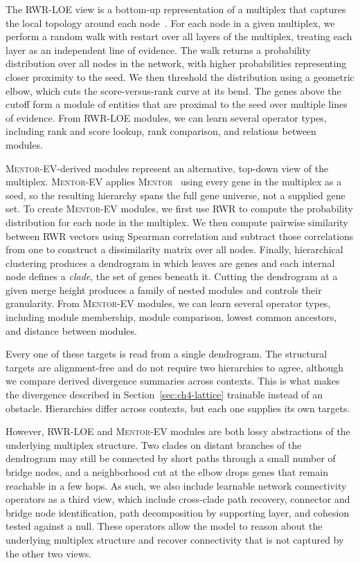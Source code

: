 The RWR-LOE view is a bottom-up representation of a multiplex that captures the local topology around each node~\cite{kainer2025rwrtoolkit}. For each node in a given multiplex, we perform a random walk with restart over all layers of the multiplex, treating each layer as an independent line of evidence. The walk returns a probability distribution over all nodes in the network, with higher probabilities representing closer proximity to the seed. We then threshold the distribution using a geometric elbow, which cuts the score-versus-rank curve at its bend. The genes above the cutoff form a module of entities that are proximal to the seed over multiple lines of evidence. From RWR-LOE modules, we can learn several operator types, including rank and score lookup, rank comparison, and relations between modules.

\textsc{Mentor-EV}-derived modules represent an alternative, top-down view of the multiplex. \textsc{Mentor-EV} applies \textsc{Mentor}~\cite{mentor} using every gene in the multiplex as a seed, so the resulting hierarchy spans the full gene universe, not a supplied gene set. To create \textsc{Mentor-EV} modules, we first use RWR to compute the probability distribution for each node in the multiplex. We then compute pairwise similarity between RWR vectors using Spearman correlation and subtract those correlations from one to construct a dissimilarity matrix over all nodes. Finally, hierarchical clustering produces a dendrogram in which leaves are genes and each internal node defines a \textit{clade}, the set of genes beneath it. Cutting the dendrogram at a given merge height produces a family of nested modules and controls their granularity. From \textsc{Mentor-EV} modules, we can learn several operator types, including module membership, module comparison, lowest common ancestors, and distance between modules.

Every one of these targets is read from a single dendrogram. The structural targets are alignment-free and do not require two hierarchies to agree, although we compare derived divergence summaries across contexts. This is what makes the divergence described in Section~\ref{sec:ch4-lattice} trainable instead of an obstacle. Hierarchies differ across contexts, but each one supplies its own targets.

However, RWR-LOE and \textsc{Mentor-EV} modules are both lossy abstractions of the underlying multiplex structure. Two clades on distant branches of the dendrogram may still be connected by short paths through a small number of bridge nodes, and a neighborhood cut at the elbow drops genes that remain reachable in a few hops. As such, we also include learnable network connectivity operators as a third view, which include cross-clade path recovery, connector and bridge node identification, path decomposition by supporting layer, and cohesion tested against a null. These operators allow the model to reason about the underlying multiplex structure and recover connectivity that is not captured by the other two views.

